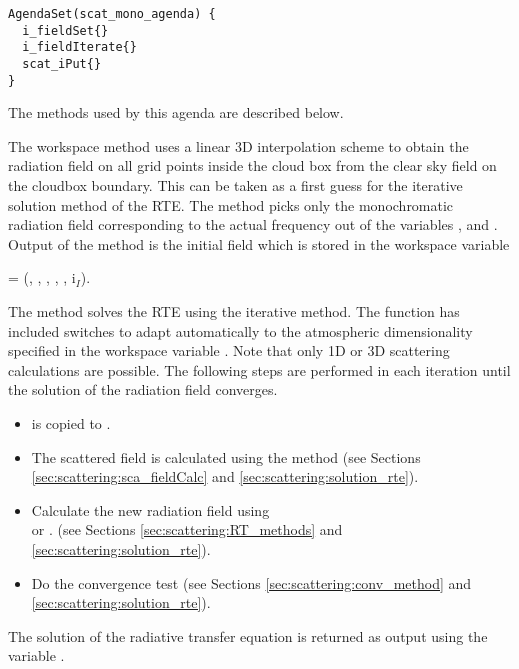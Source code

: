 \begin{verbatim}
AgendaSet(scat_mono_agenda) {
  i_fieldSet{}
  i_fieldIterate{}
  scat_iPut{}
}
\end{verbatim}

\noindent
The methods used by this agenda are described below.

 
The workspace method  
uses a linear 3D interpolation scheme to obtain the 
radiation field on all grid points inside the cloud box from the clear
sky field on the cloudbox boundary.
This can be taken as a first guess for the iterative solution method
of the RTE.  The method picks only the monochromatic radiation field
corresponding to the actual frequency out of the variables
,  and
. Output of the method is the initial field 
which is stored in the workspace variable
\begin{center}
  =  (\Prs, \Lat, \Lon, \ScaZa,
\ScaAa, i$_I$). 
\end{center}


The method  solves the RTE using the
iterative method.  The function has
included switches to adapt automatically to the atmospheric
dimensionality specified
in the workspace variable . Note that only
1D or 3D scattering calculations are possible. 
The following steps are performed in each iteration until the solution
of the radiation field converges.

\begin{itemize}
\item {} is copied to .
\item The scattered field is calculated using the method
    (see Sections \ref{sec:scattering:sca_fieldCalc} and
    \ref{sec:scattering:solution_rte}).
\item Calculate the new radiation field using\\
   or .
 (see Sections \ref{sec:scattering:RT_methods} and
  \ref{sec:scattering:solution_rte}).
\item Do the convergence test (see Sections
  \ref{sec:scattering:conv_method} and \ref{sec:scattering:solution_rte}).
\end{itemize}
The solution of the radiative transfer equation is returned as output
using the variable . 

